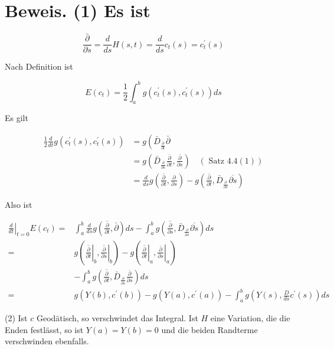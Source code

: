 \documentclass[10pt, letterpaper]{article}
\begin{document}
\section*{Beweis. (1) Es ist}
$$
\frac{\bar{\partial}}{\partial s}=\frac{d}{d s} H(s, t)=\frac{d}{d s} c_{t}(s)=c_{t}^{\prime}(s)
$$

Nach Definition ist

$$
E\left(c_{t}\right)=\frac{1}{2} \int_{a}^{b} g\left(c_{t}^{\prime}(s), c_{t}^{\prime}(s)\right) d s
$$

Es gilt


\begin{align*}
\frac{1}{2} \frac{d}{d t} g\left(c_{t}^{\prime}(s), c_{t}^{\prime}(s)\right) & =g\left(\bar{D}_{\frac{\partial}{\partial t}} \bar{\partial}\right.  \tag{2}\\
& =g\left(\bar{D}_{\frac{\partial}{\partial s}} \frac{\bar{\partial}}{\partial t}, \frac{\bar{\partial}}{\partial s}\right) \quad(\text { Satz } 4.4(1))  \tag{1}\\
& =\frac{d}{d s} g\left(\overline{\frac{\partial}{\partial t}}, \frac{\partial}{\partial s}\right)-g\left(\overline{\frac{\partial}{\partial t}}, \bar{D}_{\frac{\partial}{\partial s}} \overline{\partial s}\right) \tag{2}
\end{align*}


Also ist

$$
\begin{aligned}
\left.\frac{d}{d t}\right|_{t=0} E\left(c_{t}\right)= & \int_{a}^{b} \frac{d}{d s} g\left(\overline{\frac{\partial}{\partial t}}, \bar{\partial}\right) d s-\int_{a}^{b} g\left(\overline{\frac{\partial}{\partial s}}, \bar{D}_{\frac{\partial}{\partial s}} \overline{\partial s}\right) d s \\
= & g\left(\left.\overline{\frac{\partial}{\partial t}}\right|_{b},\left.\overline{\frac{\partial}{\partial s}}\right|_{b}\right)-g\left(\left.\overline{\frac{\partial}{\partial t}}\right|_{a},\left.\frac{\bar{\partial}}{\partial s}\right|_{a}\right) \\
& -\int_{a}^{b} g\left(\overline{\frac{\partial}{\partial t}}, \bar{D}_{\frac{\partial}{\partial s}} \frac{\bar{\partial}}{\partial s}\right) d s \\
= & g\left(Y(b), c^{\prime}(b)\right)-g\left(Y(a), c^{\prime}(a)\right)-\int_{a}^{b} g\left(Y(s), \frac{D}{d s} c^{\prime}(s)\right) d s
\end{aligned}
$$

(2) Ist $c$ Geodätisch, so verschwindet das Integral. Ist $H$ eine Variation, die die Enden festlässt, so ist $Y(a)=Y(b)=0$ und die beiden Randterme verschwinden ebenfalls.
\end{document}
